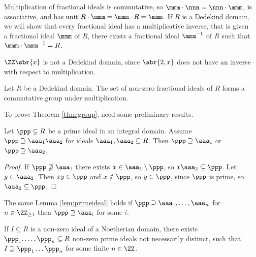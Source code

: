 Multiplication of fractional ideals is commutative, so $ \mmm \cdot \nnn = \nnn \cdot \mmm $, is associative, and has unit $ R \cdot \mmm = \mmm \cdot R = \mmm $. If $ R $ is a Dedekind domain, we will show that every fractional ideal has a multiplicative inverse, that is given a fractional ideal $ \mmm $ of $ R $, there exists a fractional ideal $ \mmm^{-1} $ of $ R $ such that $ \mmm \cdot \mmm^{-1} = R $.

\pagebreak

\begin{example*}
$ \ZZ\sbr{x} $ is not a Dedekind domain, since $ \abr{2, x} $ does not have an inverse with respect to multiplication.
\end{example*}

\begin{theorem}
\label{thm:group}
Let $ R $ be a Dedekind domain. The set of non-zero fractional ideals of $ R $ forms a commutative group under multiplication.
\end{theorem}

To prove Theorem \ref{thm:group}, need some preliminary results.

\begin{lemma}
\label{lem:primeideal}
Let $ \ppp \subsetneq R $ be a prime ideal in an integral domain. Assume $ \ppp \supseteq \aaa_1\aaa_2 $ for ideals $ \aaa_1, \aaa_2 \subseteq R $. Then $ \ppp \supseteq \aaa_1 $ or $ \ppp \supseteq \aaa_2 $.
\end{lemma}

\begin{proof}
If $ \ppp \nsupseteq \aaa_1 $ there exists $ x \in \aaa_1 \setminus \ppp $, so $ x\aaa_2 \subseteq \ppp $. Let $ y \in \aaa_2 $. Then $ xy \in \ppp $ and $ x \notin \ppp $, so $ y \in \ppp $, since $ \ppp $ is prime, so $ \aaa_2 \subseteq \ppp $.
\end{proof}

\begin{remark*}
The same Lemma \ref{lem:primeideal} holds if $ \ppp \supseteq \aaa_1, \dots, \aaa_n $ for $ n \in \ZZ_{\ge 1} $ then $ \ppp \supseteq \aaa_i $ for some $ i $.
\end{remark*}

\begin{lemma}
\label{lem:primeproduct}
If $ I \subseteq R $ is a non-zero ideal of a Noetherian domain, there exists $ \ppp_1, \dots, \ppp_n \subseteq R $ non-zero prime ideals not necessarily distinct, such that $ I \supseteq \ppp_1 \dots \ppp_n $ for some finite $ n \in \ZZ $.
\end{lemma}

